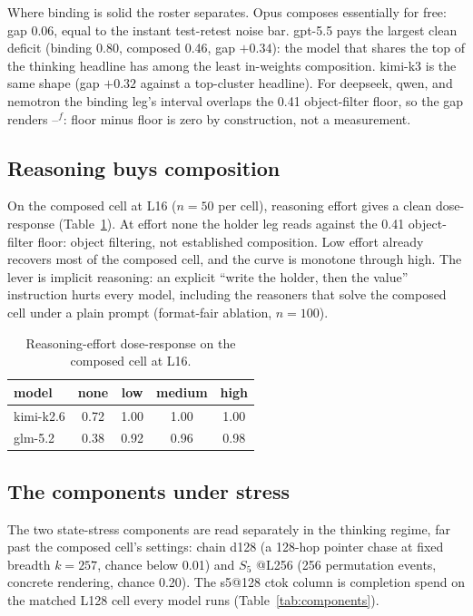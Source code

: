 \documentclass[11pt]{article}
\newcommand{\floorgap}{--$^{f}$}
\newcommand{\Sfive}{$S_5$}
\begin{document}
Where binding is solid the roster separates. Opus composes essentially for free: gap 0.06,
equal to the instant test-retest noise bar. gpt-5.5 pays the largest clean deficit (binding
0.80, composed 0.46, gap $+0.34$): the model that shares the top of the thinking headline has
among the least in-weights composition. kimi-k3 is
the same shape (gap $+0.32$ against a top-cluster headline). For deepseek, qwen, and nemotron
the binding leg's interval overlaps the 0.41 object-filter floor, so the gap renders
\floorgap: floor minus floor is zero by construction, not a measurement.

\subsection{Reasoning buys composition}

On the composed cell at L16 ($n=50$ per cell), reasoning effort gives a clean dose-response
(Table~\ref{tab:dose}). At effort none the holder leg reads against the 0.41 object-filter
floor: object filtering, not established composition. Low effort already recovers most of the
composed cell, and the curve is monotone through high. The lever is implicit reasoning: an
explicit ``write the holder, then the value'' instruction hurts every model, including the
reasoners that solve the composed cell under a plain prompt (format-fair ablation, $n=100$).

\begin{table}[h]
\centering
\begin{tabular}{lcccc}
\toprule
model & none & low & medium & high \\
\midrule
kimi-k2.6 & 0.72 & 1.00 & 1.00 & 1.00 \\
glm-5.2 & 0.38 & 0.92 & 0.96 & 0.98 \\
\bottomrule
\end{tabular}
\caption{Reasoning-effort dose-response on the composed cell at L16.}
\label{tab:dose}
\end{table}

\subsection{The components under stress}

The two state-stress components are read separately in the thinking regime, far past the
composed cell's settings: chain d128 (a 128-hop pointer chase at fixed breadth $k=257$, chance
below 0.01) and \Sfive{} @L256 (256 permutation events, concrete rendering, chance 0.20). The
s5@128 ctok column is completion spend on the matched L128 cell every model runs
(Table~\ref{tab:components}).
\end{document}
